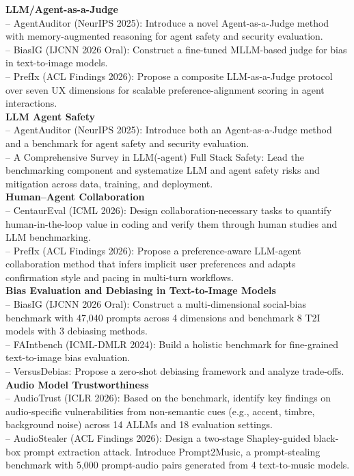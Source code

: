 \documentclass[a4paper,9pt]{extarticle}
\begin{document}
\noindent
\textbf{LLM/Agent-as-a-Judge}\\
-- AgentAuditor (NeurIPS 2025): Introduce a novel Agent-as-a-Judge method with memory-augmented reasoning for agent safety and security evaluation.\\
-- BiasIG (IJCNN 2026 Oral): Construct a fine-tuned MLLM-based judge for bias in text-to-image models.\\
-- PrefIx (ACL Findings 2026): Propose a composite LLM-as-a-Judge protocol over seven UX dimensions for scalable preference-alignment scoring in agent interactions.\\[-2pt]

\noindent
\textbf{LLM Agent Safety}\\
-- AgentAuditor (NeurIPS 2025): Introduce both an Agent-as-a-Judge method and a benchmark for agent safety and security evaluation.\\
-- A Comprehensive Survey in LLM(-agent) Full Stack Safety: Lead the benchmarking component and systematize LLM and agent safety risks and mitigation across data, training, and deployment.\\[-2pt]

\noindent
\textbf{Human--Agent Collaboration}\\
-- CentaurEval (ICML 2026): Design collaboration-necessary tasks to quantify human-in-the-loop value in coding and verify them through human studies and LLM benchmarking.\\
-- PrefIx (ACL Findings 2026): Propose a preference-aware LLM-agent collaboration method that infers implicit user preferences and adapts confirmation style and pacing in multi-turn workflows.\\[-2pt]

\noindent
\textbf{Bias Evaluation and Debiasing in Text-to-Image Models}\\
-- BiasIG (IJCNN 2026 Oral): Construct a multi-dimensional social-bias benchmark with 47,040 prompts across 4 dimensions and benchmark 8 T2I models with 3 debiasing methods.\\
-- FAIntbench (ICML-DMLR 2024): Build a holistic benchmark for fine-grained text-to-image bias evaluation.\\
-- VersusDebias: Propose a zero-shot debiasing framework and analyze trade-offs.\\[-2pt]

\noindent
\textbf{Audio Model Trustworthiness}\\
-- AudioTrust (ICLR 2026): Based on the benchmark, identify key findings on audio-specific vulnerabilities from non-semantic cues (e.g., accent, timbre, background noise) across 14 ALLMs and 18 evaluation settings.\\
-- AudioStealer (ACL Findings 2026): Design a two-stage Shapley-guided black-box prompt extraction attack. Introduce Prompt2Music, a prompt-stealing benchmark with 5,000 prompt-audio pairs generated from 4 text-to-music models.\\[2pt]
\end{document}
